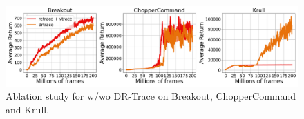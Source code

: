 



\begin{figure}[h]
    \centering
\includegraphics[width=\linewidth]{body/ablation/dr_ablation.pdf}
    \caption{Ablation study for w/wo DR-Trace on Breakout, ChopperCommand and Krull.}
    \label{fig:app_dr_trace}
\end{figure}

